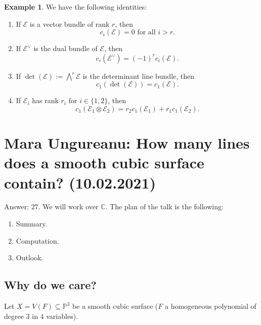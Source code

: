 \documentclass[12pt,a4paper]{amsart}
\theoremstyle{plain}
\theoremstyle{definition}
\newtheorem{exmp}[thm]{Example}
\theoremstyle{remark}
\begin{document}
\begin{exmp}
  We have the following identities:
  \begin{enumerate}
    \item If $\mathscr{E}$ is a vector bundle of rank $r$, then
      \[ c_{i}(\mathscr{E}) = 0 \text{ for all } i > r. \]
    \item If $\mathscr{E}^{\vee}$ is the dual bundle of $\mathscr{E}$, then
      \[ c_{i}(\mathscr{E}^{\vee}) = (-1)^{r}c_{i}(\mathscr{E}). \]
    \item If $\det(\mathscr{E}) := \bigwedge^{r}\mathscr{E}$ is the determinant line bundle, then
      \[ c_{1}(\det(\mathscr{E})) = c_{1}(\mathscr{E}). \]
    \item If $\mathscr{E}_{i}$ has rank $r_{i}$ for $i \in \{1,2\}$, then
      \[ c_{1}(\mathscr{E}_{1} \otimes \mathscr{E}_{2}) = r_{2}c_{1}(\mathscr{E}_{1}) + r_{1}c_{1}(\mathscr{E}_{2}). \]
  \end{enumerate}
\end{exmp}

\section{Mara Ungureanu: How many lines does a smooth cubic surface contain? (10.02.2021)}

Answer: $27$.
We will work over $\mathbb{C}$.
The plan of the talk is the following:

\begin{enumerate}
  \item Summary.
  \item Computation.
  \item Outlook.
\end{enumerate}

\subsection{Why do we care?}

Let $X = V(F) \subseteq \mathbb{P}^{3}$ be a smooth cubic surface ($F$ a homogeneous polynomial of degree $3$ in $4$ variables).
\end{document}

